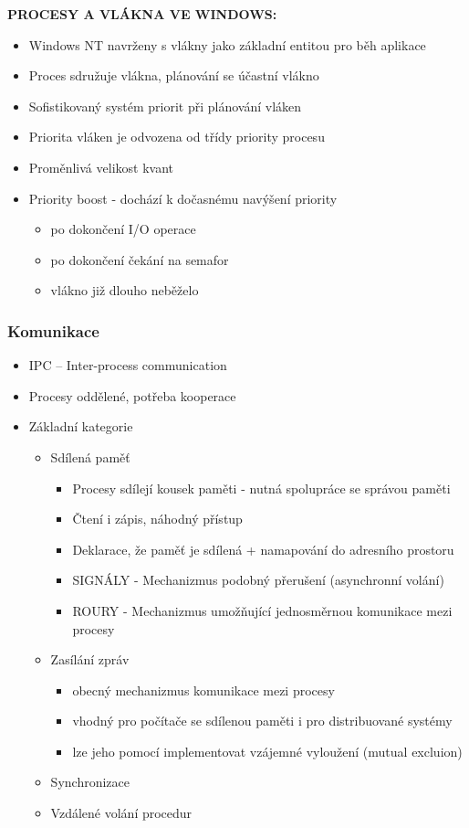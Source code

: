 \documentclass[10pt,a4paper]{article}
\begin{document}
\textbf{PROCESY A VLÁKNA VE WINDOWS:}
\begin{itemize}
	\item Windows NT navrženy s vlákny jako základní entitou pro běh aplikace
	\item Proces sdružuje vlákna, plánování se účastní vlákno
	\item Sofistikovaný systém priorit při plánování vláken
	\item Priorita vláken je odvozena od třídy priority procesu
	\item Proměnlivá velikost kvant
	\item Priority boost - dochází k dočasnému navýšení priority
	\begin{itemize}
		\item po dokončení I/O operace
		\item po dokončení čekání na semafor
		\item vlákno již dlouho neběželo
	\end{itemize}
\end{itemize}

\subsubsection{Komunikace}
\begin{itemize}
	\item IPC – Inter-process communication
	\item Procesy oddělené, potřeba kooperace
	\item Základní kategorie
	\begin{itemize}
		\item Sdílená paměť
		\begin{itemize}
			\item Procesy sdílejí kousek paměti - nutná spolupráce se správou paměti
			\item Čtení i zápis, náhodný přístup
			\item Deklarace, že paměť je sdílená + namapování do adresního prostoru
			\item SIGNÁLY - Mechanizmus podobný přerušení (asynchronní volání)
			\item ROURY - Mechanizmus umožňující jednosměrnou komunikace mezi procesy
		\end{itemize}
		\item Zasílání zpráv
		\begin{itemize}
			\item obecný mechanizmus komunikace mezi procesy
			\item vhodný pro počítače se sdílenou paměti i pro distribuované systémy
			\item lze jeho pomocí implementovat vzájemné vyloužení (mutual excluion)
		\end{itemize}
		\item Synchronizace
		\item Vzdálené volání procedur
	\end{itemize}
\end{itemize}
\end{document}
